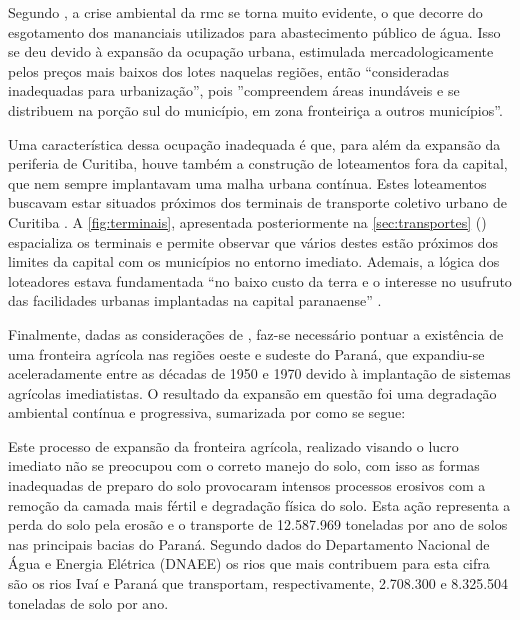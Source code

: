 	Segundo , a crise ambiental da \gls{rmc} se torna muito evidente, o que decorre do esgotamento dos mananciais utilizados para abastecimento público de água. Isso se deu devido à expansão da ocupação urbana, estimulada mercadologicamente pelos preços mais baixos dos lotes naquelas regiões, então ``consideradas inadequadas para urbanização'', pois ''compreendem áreas inundáveis e se distribuem na porção sul do município, em zona fronteiriça a outros municípios''.
	
	Uma característica dessa ocupação inadequada é que, para além da expansão da periferia de Curitiba, houve também a construção de loteamentos fora da capital, que nem sempre implantavam uma malha urbana contínua. Estes loteamentos buscavam estar situados próximos dos terminais de transporte coletivo urbano de Curitiba \cite[p. 138]{lima2001a}. A \autoref{fig:terminais}, apresentada posteriormente na \autoref{sec:transportes} () espacializa os terminais e permite observar que vários destes estão próximos dos limites da capital com os municípios no entorno imediato. Ademais, a lógica dos loteadores estava fundamentada ``no baixo custo da terra e o interesse no usufruto das facilidades urbanas implantadas na capital paranaense'' \cite[p. 138]{lima2001a}.
	
	Finalmente, dadas as considerações de , faz-se necessário pontuar a existência de uma fronteira agrícola nas regiões oeste e sudeste do Paraná, que expandiu-se aceleradamente entre as décadas de 1950 e 1970 devido à implantação de sistemas agrícolas imediatistas. O resultado da expansão em questão foi uma degradação ambiental contínua e progressiva, sumarizada por  como se segue:
	
	\begin{citacao}
		Este processo de expansão da fronteira agrícola, realizado visando o lucro imediato não se preocupou com o correto manejo do solo, com isso as formas inadequadas de preparo do solo provocaram intensos processos erosivos com a remoção da camada mais fértil e degradação física do solo. Esta ação representa a perda do solo pela erosão e o transporte de 12.587.969 toneladas por ano de solos nas principais bacias do Paraná. Segundo dados do Departamento Nacional de Água e Energia Elétrica (DNAEE) os rios que mais contribuem para esta cifra são os rios Ivaí e Paraná que transportam, respectivamente, 2.708.300 e 8.325.504 toneladas de solo por ano.
	\end{citacao}
	
